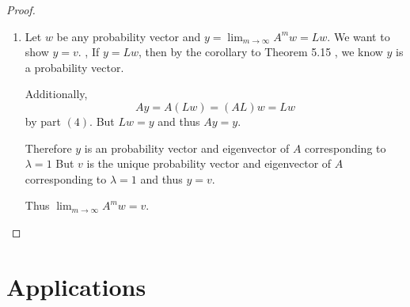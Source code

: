 \documentclass{amsart}
\theoremstyle{definition}
\theoremstyle{remark}
\numberwithin{equation}{section}
\begin{document}
\begin{proof}
\begin{enumerate}
	\item 
		Let $w$ be any probability vector and $y = \lim_{m \to \infty} A^m w  = Lw$.
		We want to show $y = v$.
		,
		If $y = Lw$, then by the corollary to Theorem 5.15 \cite{friedberg2003linear}, we know $y$ is a probability vector.

		Additionally,
		$$Ay = A(Lw) = (AL)w = Lw$$
		by part $(4)$.
		But $Lw = y$ and thus $Ay = y$.

		Therefore $y$ is an probability vector and eigenvector of $A$ corresponding to $\lambda = 1$
		But $v$ is the unique probability vector and eigenvector of $A$ corresponding to $\lambda = 1$ and thus $y = v$.

		Thus $\lim_{m \to \infty} A^m w = v$.


\end{enumerate}


\end{proof}

\section{Applications}


 
\end{document}
